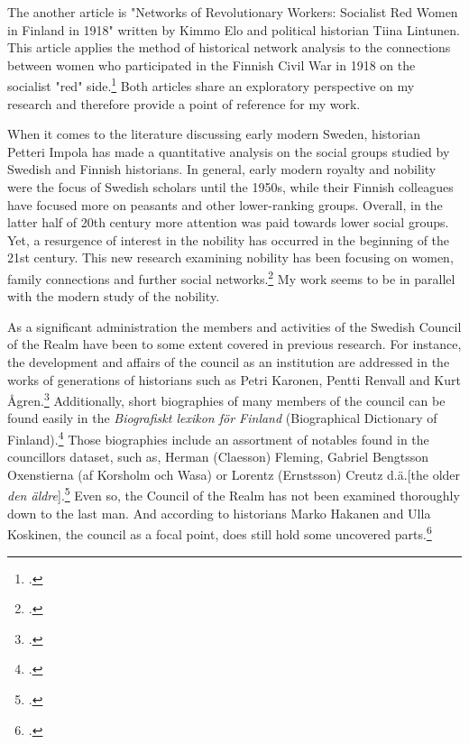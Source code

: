 The another article is "Networks of Revolutionary Workers: Socialist Red Women in Finland in 1918" written by Kimmo Elo and political historian Tiina Lintunen. This article applies the method of historical network analysis to the connections between women who participated in the Finnish Civil War in 1918 on the socialist "red" side.\footcite[Almost the same article is found in Finnish from the \textit{Historiallinen Aikakauskirja} 116 (2/2018).]{LintunenAndElo2019} Both articles share an exploratory perspective on my research and therefore provide a point of reference for my work. 

When it comes to the literature discussing early modern Sweden, historian Petteri Impola has made a quantitative analysis on the social groups studied by Swedish and Finnish historians. In general, early modern royalty and nobility were the focus of Swedish scholars until the 1950s, while their Finnish colleagues have focused more on peasants and other lower-ranking groups. Overall, in the latter half of 20th century more attention was paid towards lower social groups. Yet, a resurgence of interest in the nobility has occurred in the beginning of the 21st century. This new research examining nobility has been focusing on women, family connections and further social networks.\footcite[see also \textit{Aatelin historia Suomessa}(2020) by Alex Snellman, Anu Lahtinen, Janne Haikari and Marko Hakanen]{impola2024} My work seems to be in parallel with the modern study of the nobility.

As a significant administration the members and activities of the Swedish Council of the Realm have been to some extent covered in previous research. For instance, the development and affairs of the council as an institution are addressed in the works of generations of historians such as Petri Karonen, Pentti Renvall and Kurt Ågren.\footcites{pSuurvalta}[See e. g. Pentti Renvall "Keskitetyn hallintolaitoksen kehitys" in \textit{Suomen kulttuurihistoria. II} (1934) or Kurt Ågren "Rise and decline of an aristocracy: The Swedish social and political elite in the 17th century" in the \textit{Scandinavian journal of history} (1976).]{hopesAndFearsCouncil} Additionally, short biographies of many members of the council can be found easily in the \textit{Biografiskt lexikon för Finland} (Biographical Dictionary of Finland).\footcite{blf} Those biographies include an assortment of notables found in the councillors dataset, such as, Herman (Claesson) Fleming, Gabriel Bengtsson Oxenstierna (af Korsholm och Wasa) or Lorentz (Ernstsson) Creutz d.ä.[the older \textit{den äldre}].\footcite{blf-list} Even so, the Council of the Realm has not been examined thoroughly down to the last man. And according to historians Marko Hakanen and Ulla Koskinen, the council as a focal point, does still hold some uncovered parts.\footcite[pp. 47-48.]{HakanenAKoskinen2017} 

